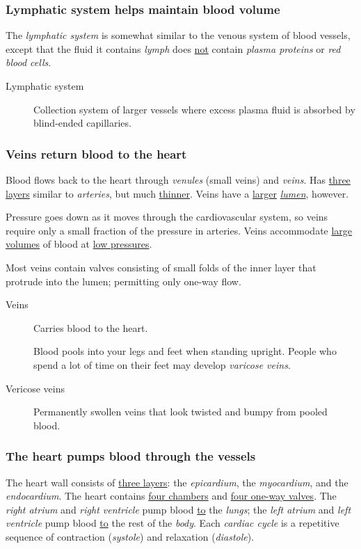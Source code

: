 \documentclass[11pt]{article}
\begin{document}
\subsubsection{Lymphatic system helps maintain blood volume}
\label{sec:org00e5a97}
The \emph{lymphatic system} is somewhat similar to the venous system of blood
vessels, except that the fluid it contains \emph{lymph} does \uline{not} contain \emph{plasma
proteins} or \emph{red blood cells}.

\begin{description}
\item[{Lymphatic system}] Collection system of larger vessels where excess
plasma fluid is absorbed by blind-ended capillaries.
\end{description}

\subsubsection{Veins return blood to the heart}
\label{sec:org2e6559a}
Blood flows back to the heart through \emph{venules} (small veins) and \emph{veins}. Has
\uline{three layers} similar to \emph{arteries}, but much \uline{thinner}. Veins have a \uline{larger}
\emph{\uline{lumen}}, however.

Pressure goes down as it moves through the cardiovascular system, so veins
require only a small fraction of the pressure in arteries. Veins accommodate
\uline{large volumes} of blood at \uline{low pressures}.

Most veins contain valves consisting of small folds of the inner layer that
protrude into the lumen; permitting only one-way flow.

\begin{description}
\item[{Veins}] Carries blood to the heart.

Blood pools into your legs and feet when standing upright. People who
spend a lot of time on their feet may develop \emph{varicose veins}.

\item[{Vericose veins}] Permanently swollen veins that look twisted and bumpy
from pooled blood.
\end{description}

\subsubsection{The heart pumps blood through the vessels}
\label{sec:org5c9df22}
The heart wall consists of \uline{three layers}: the \emph{epicardium}, the \emph{myocardium}, and
the \emph{endocardium}. The heart contains \uline{four chambers} and \uline{four one-way valves}.
The \emph{right atrium} and \emph{right ventricle} pump blood \uline{to} the \emph{lungs}; the \emph{left
atrium} and \emph{left ventricle} pump blood \uline{to} the rest of the \emph{body}. Each \emph{cardiac
cycle} is a repetitive sequence of contraction (\emph{systole}) and relaxation
(\emph{diastole}).
\end{document}
